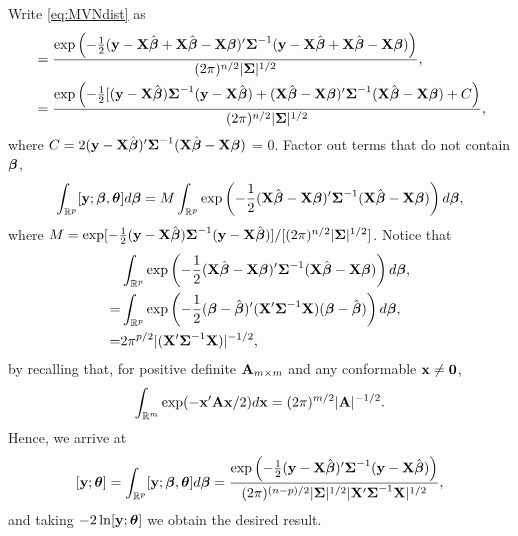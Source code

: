 \documentclass[12pt, titlepage]{article}
\begin{document}
\flushleft Write \eqref{eq:MVNdist} as
\begin{align*}
[\mathbf{y};\bbeta,\btheta] & = 
\frac{\exp\left(-\frac{1}{2}(\mathbf{y} - \mathbf{X}\hat{\bbeta} + \mathbf{X}\hat{\bbeta} - \mathbf{X}\bbeta)\upp\bSigma^{-1}(\mathbf{y} - \mathbf{X}\hat{\bbeta} + \mathbf{X}\hat{\bbeta} -  \mathbf{X}\bbeta)\right)}{(2\pi)^{n/2}|\bSigma|^{1/2}}, \\
{} & = 
\frac{\exp\left(-\frac{1}{2}[(\mathbf{y} - \mathbf{X}\hat{\bbeta})\bSigma^{-1}(\mathbf{y} - \mathbf{X}\hat{\bbeta}) + (\mathbf{X}\hat{\bbeta} - \mathbf{X}\bbeta)\upp\bSigma^{-1}(\mathbf{X}\hat{\bbeta} -  \mathbf{X}\bbeta) + C\right)}{(2\pi)^{n/2}|\bSigma|^{1/2}},
\end{align*}
where $C = 2(\mathbf{y} - \mathbf{X}\hat{\boldsymbol{\beta}})^{\prime}\mbox{\boldmath $\Sigma$}^{-1}(\mathbf{X}\hat{\boldsymbol{\beta}} - \mathbf{X}\boldsymbol{\beta})$ = 0.
Factor out terms that do not contain $\boldsymbol{\beta}$,
$$
\int_{\mathbb{R}^p} [\mathbf{y};\boldsymbol{\beta},\boldsymbol{\theta}] d\boldsymbol{\beta} = M
\int_{\mathbb{R}^p} \exp\left(-\frac{1}{2}(\mathbf{X}\hat{\boldsymbol{\beta}} - \mathbf{X}\boldsymbol{\beta})^{\prime}\mbox{\boldmath $\Sigma$}^{-1}(\mathbf{X}\hat{\boldsymbol{\beta}} -  \mathbf{X}\boldsymbol{\beta})\right)d\boldsymbol{\beta},
$$
where $M = \exp[-\frac{1}{2}(\mathbf{y} - \mathbf{X}\hat{\boldsymbol{\beta}})\mbox{\boldmath $\Sigma$}^{-1}(\mathbf{y} - \mathbf{X}\hat{\boldsymbol{\beta}})]/[(2\pi)^{n/2}|\mbox{\boldmath $\Sigma$}|^{1/2}]$.
Notice that
\begin{align*}
	{} & \int_{\mathbb{R}^p} \exp\left(-\frac{1}{2}(\mathbf{X}\hat{\boldsymbol{\beta}} - \mathbf{X}\boldsymbol{\beta})^{\prime}\mbox{\boldmath $\Sigma$}^{-1}(\mathbf{X}\hat{\boldsymbol{\beta}} -  \mathbf{X}\boldsymbol{\beta})\right)d\boldsymbol{\beta}, \\
  = & \int_{\mathbb{R}^p} \exp\left(-\frac{1}{2}(\boldsymbol{\beta} - \hat{\boldsymbol{\beta}})^{\prime}(\mathbf{X}^{\prime}\mbox{\boldmath $\Sigma$}^{-1}\mathbf{X})(\boldsymbol{\beta} -  \hat{\boldsymbol{\beta}})\right)d\boldsymbol{\beta}, \\
	= & 2\pi^{p/2}|(\mathbf{X}^{\prime}\mbox{\boldmath $\Sigma$}^{-1}\mathbf{X})|^{-1/2},
\end{align*}
by recalling that, for positive definite $\mathbf{A}_{m \times m}$ and any conformable $\mathbf{x} \ne \mathbf{0}$,
$$
	\int_{\mathbb{R}^m}\exp(-\mathbf{x}^{\prime}\mathbf{A}\mathbf{x}/2) d\mathbf{x} = (2\pi)^{m/2}|\mathbf{A}|^{-1/2}.
$$
Hence, we arrive at
$$
[\mathbf{y};\boldsymbol{\theta}] = \int_{\mathbb{R}^p} [\mathbf{y};\boldsymbol{\beta},\boldsymbol{\theta}] d\boldsymbol{\beta} = \frac{\exp\left(-\frac{1}{2}(\mathbf{y} - \mathbf{X}\hat{\boldsymbol{\beta}})^{\prime}\mbox{\boldmath $\Sigma$}^{-1}(\mathbf{y} - \mathbf{X}\hat{\boldsymbol{\beta}})\right)}{(2\pi)^{(n-p)/2}|\mbox{\boldmath $\Sigma$}|^{1/2}|\mathbf{X}^{\prime}\mbox{\boldmath $\Sigma$}^{-1}\mathbf{X}|^{1/2}},
$$
and taking $-2 \ln [\mathbf{y};\boldsymbol{\theta}]$ we obtain the desired result.

\end{document}
